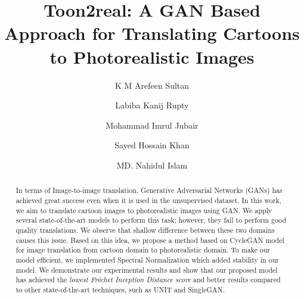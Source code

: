 \documentclass[runningheads]{llncs}
\begin{document}
%
\title{Toon2real: A GAN Based Approach for Translating Cartoons to Photorealistic Images}
%
%
\author{K M Arefeen Sultan 
\and Labiba Kanij Rupty
\and Mohammad Imrul Jubair 
\and Sayed Hossain Khan
\and MD. Nahidul Islam
} 
%
%
%
\maketitle              %
%
\begin{abstract}
In terms of Image-to-image translation, Generative Adversarial Networks (GANs) has achieved great success even when it is used in the unsupervised dataset. In this work, we aim to translate cartoon images to photorealistic images using GAN.
We apply several state-of-the-art models to perform this task; however, they fail to perform good quality translations.
We observe that shallow difference between these two domains causes this issue. Based on this idea, we propose a method based on CycleGAN model for image translation from cartoon domain to photorealistic domain. To make our model efficient, we implemented Spectral Normalization which added stability in our model. We demonstrate our experimental results and show that our proposed model has achieved the \textit{lowest Fr\'echet Inception Distance score} and better results compared to other state-of-the-art techniques, such as UNIT and SingleGAN.

\end{abstract}
%
%
%
\end{document}
